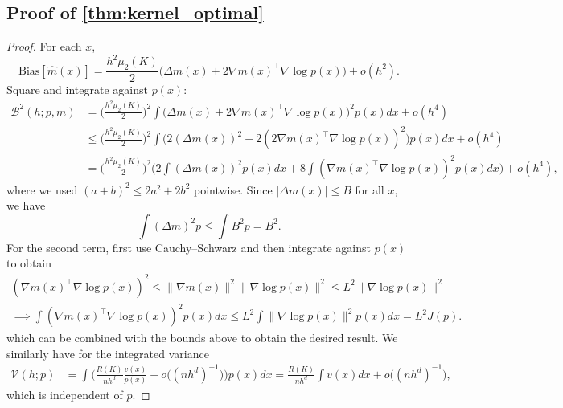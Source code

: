 \subsection{Proof of \cref{thm:kernel_optimal}}
\label{proof:kernel_optimal}
\begin{proof}
For each $x$,
\[
\mathrm{Bias}[\widehat m(x)]=\frac{h^2\mu_2(K)}{2}\Big(\Delta m(x)+2\nabla m(x)^\top \nabla\log p(x)\Big)+o(h^2).
\]
Square and integrate against $p(x)$:
\begin{align*}
\mathcal{B}^2(h;p,m)
&=\Big(\frac{h^2\mu_2(K)}{2}\Big)^2\int \Big(\Delta m(x)+2\nabla m(x)^\top \nabla\log p(x)\Big)^2p(x)dx+o(h^4)\\
&\le \Big(\frac{h^2\mu_2(K)}{2}\Big)^2
\int \Big(2(\Delta m(x))^2+2(2\nabla m(x)^\top \nabla\log p(x))^2\Big)p(x)dx+o(h^4)\\
&=\Big(\frac{h^2\mu_2(K)}{2}\Big)^2\Big(2\int (\Delta m(x))^2p(x)dx+8\int (\nabla m(x)^\top \nabla\log p(x))^2p(x)dx\Big)+o(h^4),
\end{align*}
where we used $(a+b)^2\le 2 a^2+2 b^2$ pointwise.
Since $|\Delta m(x)|\le B$ for all $x$, we have
\[
\int (\Delta m)^2p \le \int B^2p = B^2.
\]
For the second term, first use Cauchy--Schwarz 
and then integrate against $p(x)$ to obtain
\begin{align*}
(\nabla m(x)^\top \nabla\log p(x))^2 \le \|\nabla m(x)\|^2\|\nabla\log p(x)\|^2 \le L^2\|\nabla\log p(x)\|^2\\
\implies \int (\nabla m(x)^\top \nabla\log p(x))^2p(x)dx
\le L^2\int \|\nabla\log p(x)\|^2p(x)dx
= L^2J(p).
\end{align*}
which can be combined with the bounds above to obtain the desired result. We similarly have for the integrated variance
\begin{align*}
\mathcal{V}(h;p)
&=\int \Big(\frac{R(K)}{n h^d}\frac{v(x)}{p(x)}+o\big((n h^d)^{-1}\big)\Big)p(x)dx=\frac{R(K)}{n h^d}\int v(x)dx+o\big((n h^d)^{-1}\big),
\end{align*}
which is independent of $p$.
\end{proof}

